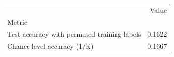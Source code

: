 \begin{tabular}{lr}
\toprule
 & Value \\
Metric &  \\
\midrule
Test accuracy with permuted training labels & 0.1622 \\
Chance-level accuracy (1/K) & 0.1667 \\
\bottomrule
\end{tabular}
